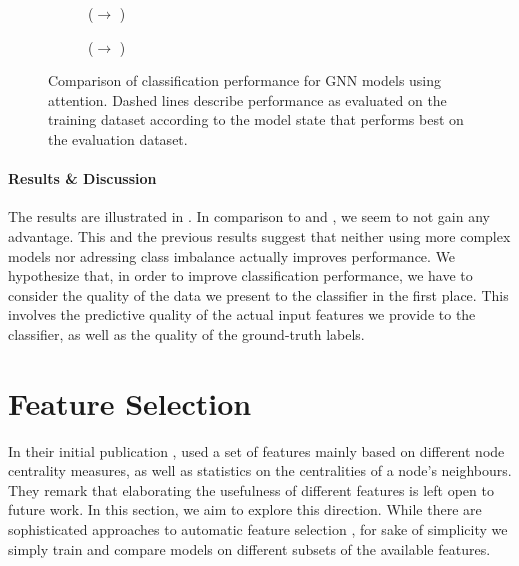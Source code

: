 \documentclass[
	fontsize=10pt, %
	twoside=true, %
	secnumdepth=1, %
  toc=indentunnumbered %
]{kaobook}
\begin{document}
\begin{figure}[h]
\centering
\begin{subfigure}[h]{0.48\linewidth}
  \caption{(\ADLast $\rightarrow$ \PDMap)}
\end{subfigure}
\begin{subfigure}[h]{0.48\linewidth}
  \caption{(\ADLast $\rightarrow$ \ReconMap{})}
\end{subfigure}
\caption{Comparison of classification performance for GNN models using
  attention. Dashed lines describe performance as evaluated on the training
  dataset according to the model state that performs best on the evaluation dataset.}
\label{fig:results-attention}
\end{figure}

\paragraph{Results \& Discussion} The results are illustrated in
. In comparison to 
and , we seem to not gain any advantage.
%
This and the previous results suggest that neither using more complex models nor
adressing class imbalance actually improves performance. We hypothesize that, in
order to improve classification performance, we have to consider the quality of
the data we present to the classifier in the first place. This involves the
predictive quality of the actual input features we provide to the classifier, as
well as the quality of the ground-truth labels.





\section{Feature Selection}
\label{sec:feature-selection}

In their initial publication \cite{nielsen_MachineLearningSupport_2019},
\nielsen{} used a set of features mainly based on different node centrality
measures, as well as statistics on the centralities of a node's neighbours. They
remark that elaborating the usefulness of different features is left open to
future work. In this section, we aim to explore this direction.
%
While there are sophisticated approaches to automatic feature selection  
\cite{saeys_ReviewFeatureSelection_2007},
for sake of simplicity we simply train and compare models on different subsets
of the available features.
\end{document}
